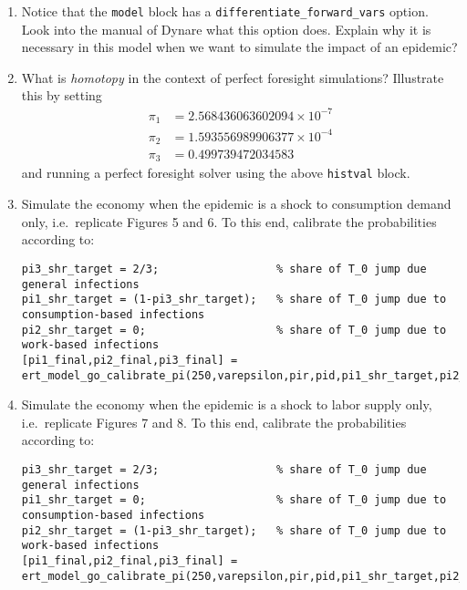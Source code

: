 \begin{enumerate}
\item Notice that the \texttt{model} block has a \texttt{differentiate\_forward\_vars} option.
Look into the manual of Dynare \parencite{Adjemian.Bastani.Juillard.EtAl_2022_DynareReferenceManual} what this option does.
Explain why it is necessary in this model when we want to simulate the impact of an epidemic?

\item What is \emph{homotopy} in the context of perfect foresight simulations?
Illustrate this by setting
\begin{align*}
\pi_1 &= 2.568436063602094 \times 10^{-7}\\
\pi_2 &= 1.593556989906377  \times 10^{-4}\\
\pi_3 &= 0.499739472034583
\end{align*}
  and running a perfect foresight solver using the above \texttt{histval} block.

\newpage

\item Simulate the economy when the epidemic is a shock to consumption demand only,
  i.e.\ replicate Figures 5 and 6.
To this end, calibrate the probabilities according to:

{\footnotesize
\begin{lstlisting}[style=Matlab-editor,basicstyle=\mlttfamily\scriptsize]
% calibation targets for shares of pi-terms in T-function in SIR model
pi3_shr_target = 2/3;                  % share of T_0 jump due general infections
pi1_shr_target = (1-pi3_shr_target);   % share of T_0 jump due to consumption-based infections
pi2_shr_target = 0;                    % share of T_0 jump due to work-based infections
[pi1_final,pi2_final,pi3_final] = ert_model_go_calibrate_pi(250,varepsilon,pir,pid,pi1_shr_target,pi2_shr_target,RplusD_target,c_ss,n_ss);
\end{lstlisting}
}

\item Simulate the economy when the epidemic is a shock to labor supply only,
  i.e.\ replicate Figures 7 and 8.
To this end, calibrate the probabilities according to:

{\footnotesize
\begin{lstlisting}[style=Matlab-editor,basicstyle=\mlttfamily\scriptsize]
pi3_shr_target = 2/3;                  % share of T_0 jump due general infections
pi1_shr_target = 0;                    % share of T_0 jump due to consumption-based infections
pi2_shr_target = (1-pi3_shr_target);   % share of T_0 jump due to work-based infections
[pi1_final,pi2_final,pi3_final] = ert_model_go_calibrate_pi(250,varepsilon,pir,pid,pi1_shr_target,pi2_shr_target,RplusD_target,c_ss,n_ss);
\end{lstlisting}
}


\end{enumerate}
